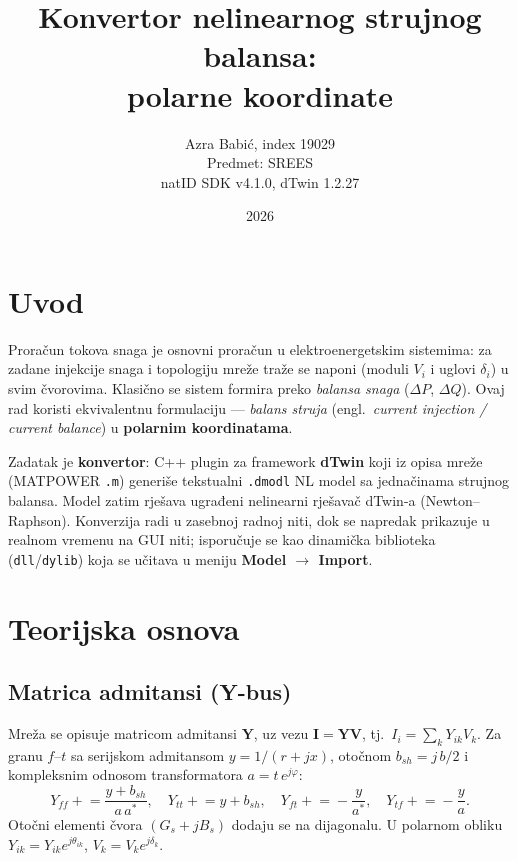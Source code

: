 \documentclass[11pt,a4paper]{article}
\title{\textbf{Konvertor nelinearnog strujnog balansa:\\ polarne koordinate}}
\author{Azra Babić, index 19029 \\ Predmet: SREES \\ natID SDK v4.1.0, dTwin 1.2.27}
\date{2026}
\begin{document}
\maketitle

\section{Uvod}
Proračun tokova snaga je osnovni proračun u elektroenergetskim sistemima: za zadane
injekcije snaga i topologiju mreže traže se naponi (moduli $V_i$ i uglovi $\delta_i$)
u svim čvorovima. Klasično se sistem formira preko \emph{balansa snaga} ($\Delta P$,
$\Delta Q$). Ovaj rad koristi ekvivalentnu formulaciju --- \emph{balans struja}
(engl.\ \textit{current injection / current balance}) u \textbf{polarnim koordinatama}.

Zadatak je \textbf{konvertor}: C++ plugin za framework \textbf{dTwin} koji iz opisa
mreže (MATPOWER \texttt{.m}) generiše tekstualni \texttt{.dmodl} NL model sa jednačinama
strujnog balansa. Model zatim rješava ugrađeni nelinearni rješavač dTwin-a
(Newton--Raphson). Konverzija radi u zasebnoj radnoj niti, dok se napredak prikazuje u
realnom vremenu na GUI niti; isporučuje se kao dinamička biblioteka (\texttt{dll}/\texttt{dylib})
koja se učitava u meniju \textbf{Model $\rightarrow$ Import}.

\section{Teorijska osnova}

\subsection{Matrica admitansi (Y-bus)}
Mreža se opisuje matricom admitansi $\mathbf{Y}$, uz vezu $\mathbf{I}=\mathbf{Y}\mathbf{V}$,
tj.\ $I_i=\sum_k Y_{ik}V_k$. Za granu $f$--$t$ sa serijskom admitansom $y=1/(r+jx)$,
otočnom $b_{sh}=j\,b/2$ i kompleksnim odnosom transformatora $a=t\,e^{j\varphi}$:
\[
Y_{ff}\!\mathrel{+}=\!\frac{y+b_{sh}}{a\,a^{*}},\quad
Y_{tt}\!\mathrel{+}=\!y+b_{sh},\quad
Y_{ft}\!\mathrel{+}=\!-\frac{y}{a^{*}},\quad
Y_{tf}\!\mathrel{+}=\!-\frac{y}{a}.
\]
Otočni elementi čvora $(G_s+jB_s)$ dodaju se na dijagonalu. U polarnom obliku
$Y_{ik}=Y_{ik}e^{j\theta_{ik}}$, $V_k=V_k e^{j\delta_k}$.
\end{document}
